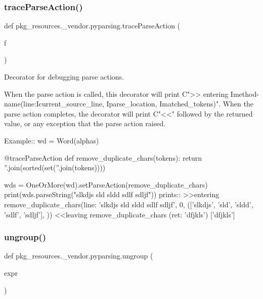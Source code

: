 \subsubsection{\texorpdfstring{trace\+Parse\+Action()}{traceParseAction()}}
{\footnotesize\ttfamily def pkg\+\_\+resources.\+\_\+vendor.\+pyparsing.\+trace\+Parse\+Action (\begin{DoxyParamCaption}\item[{}]{f }\end{DoxyParamCaption})}

\begin{DoxyVerb}Decorator for debugging parse actions. 

When the parse action is called, this decorator will print C{">> entering I{method-name}(line:I{current_source_line}, I{parse_location}, I{matched_tokens})".}
When the parse action completes, the decorator will print C{"<<"} followed by the returned value, or any exception that the parse action raised.

Example::
    wd = Word(alphas)

    @traceParseAction
    def remove_duplicate_chars(tokens):
        return ''.join(sorted(set(''.join(tokens))))

    wds = OneOrMore(wd).setParseAction(remove_duplicate_chars)
    print(wds.parseString("slkdjs sld sldd sdlf sdljf"))
prints::
    >>entering remove_duplicate_chars(line: 'slkdjs sld sldd sdlf sdljf', 0, (['slkdjs', 'sld', 'sldd', 'sdlf', 'sdljf'], {}))
    <<leaving remove_duplicate_chars (ret: 'dfjkls')
    ['dfjkls']
\end{DoxyVerb}
 \mbox{\label{namespacepkg__resources_1_1__vendor_1_1pyparsing_ab781c23a28afbeaa57480951e9d07217}} 
\subsubsection{\texorpdfstring{ungroup()}{ungroup()}}
{\footnotesize\ttfamily def pkg\+\_\+resources.\+\_\+vendor.\+pyparsing.\+ungroup (\begin{DoxyParamCaption}\item[{}]{expr }\end{DoxyParamCaption})}


